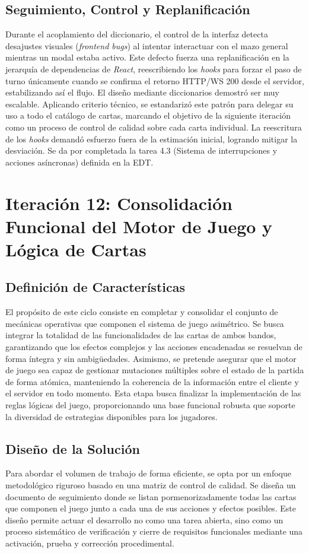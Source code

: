 \section{Seguimiento, Control y Replanificación}
Durante el acoplamiento del diccionario, el control de la interfaz detecta desajustes visuales (\textit{frontend bugs}) al intentar interactuar con el mazo general mientras un modal estaba activo. Este defecto fuerza una replanificación en la jerarquía de dependencias de \textit{React}, reescribiendo los \textit{hooks} para forzar el paso de turno únicamente cuando se confirma el retorno HTTP/WS 200 desde el servidor, estabilizando así el flujo. El diseño mediante diccionarios demostró ser muy escalable. Aplicando criterio técnico, se estandarizó este patrón para delegar su uso a todo el catálogo de cartas, marcando el objetivo de la siguiente iteración como un proceso de control de calidad sobre cada carta individual. La reescritura de los 	\textit{hooks} demandó esfuerzo fuera de la estimación inicial, logrando mitigar la desviación. Se da por completada la tarea 4.3 (Sistema de interrupciones y acciones asíncronas) definida en la EDT.


\chapter[Iteración 12: Consolidación del Motor de Juego]{Iteración 12: Consolidación Funcional del Motor de Juego y Lógica de Cartas}

\section{Definición de Características}
El propósito de este ciclo consiste en completar y consolidar el conjunto de mecánicas operativas que componen el sistema de juego asimétrico. Se busca integrar la totalidad de las funcionalidades de las cartas de ambos bandos, garantizando que los efectos complejos y las acciones encadenadas se resuelvan de forma íntegra y sin ambigüedades. Asimismo, se pretende asegurar que el motor de juego sea capaz de gestionar mutaciones múltiples sobre el estado de la partida de forma atómica, manteniendo la coherencia de la información entre el cliente y el servidor en todo momento. Esta etapa busca finalizar la implementación de las reglas lógicas del juego, proporcionando una base funcional robusta que soporte la diversidad de estrategias disponibles para los jugadores.

\section{Diseño de la Solución}
Para abordar el volumen de trabajo de forma eficiente, se opta por un enfoque metodológico riguroso basado en una matriz de control de calidad. Se diseña un documento de seguimiento donde se listan pormenorizadamente todas las cartas que componen el juego junto a cada una de sus acciones y efectos posibles. Este diseño permite actuar el desarrollo no como una tarea abierta, sino como un proceso sistemático de verificación y cierre de requisitos funcionales mediante una activación, prueba y corrección procedimental.

